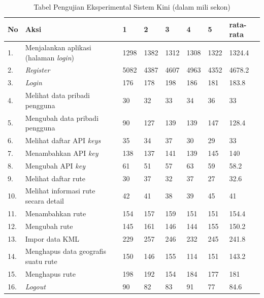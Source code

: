 \begin{table}[H]
	\centering
	\caption{Tabel Pengujian Eksperimental Sistem Kini (dalam mili sekon)}
		\begin{tabular}{|p{0.37cm}| p{7cm}| p{1cm}| p{1cm}| p{1cm}| p{1cm}| p{1cm}| p{1cm}|} \hline
		No & Aksi & 1 & 2 & 3 & 4 & 5 & rata-rata \\ \hline
		1. & Menjalankan aplikasi (halaman \textit{login}) & 1298	&	1382	&	1312	&	1308	&	1322	&	1324.4 \\ \hline
 		2. & \textit{Register} & 5082	&	4387	&	4607	&	4963	&	4352	&	4678.2 \\ \hline
		3. & \textit{Login} & 176	&	178	&	198	&	186	&	181	&	183.8 \\ \hline
		4. & Melihat data pribadi pengguna & 30	&	32	&	33	&	34	&	36	&	33 \\ \hline
		5. & Mengubah data pribadi pengguna & 90	&	127	&	139	&	139	&	147	&	128.4 \\ \hline
		6. & Melihat daftar API \textit{keys} & 35	&	34	&	37	&	30	&	29	&	33 \\ \hline
		7. & Menambahkan API \textit{key} & 138	&	137	&	141	&	139	&	145	&	140 \\ \hline
		8. & Mengubah API \textit{key} & 61	&	51	&	57	&	63	&	59	&	58.2 \\ \hline
		9. & Melihat daftar rute & 30	&	37	&	32	&	37	&	27	&	32.6 \\ \hline
		10. & Melihat informasi rute secara detail & 42	&	41	&	38	&	39	&	45	&	41 \\ \hline
		11. & Menambahkan rute & 154	&	157	&	159	&	151	&	151	&	154.4 \\ \hline
		12. & Mengubah rute & 145	&	161	&	146	&	144	&	155	&	150.2 \\ \hline
		13. & Impor data KML & 229	&	257	&	246	&	232	&	245	&	241.8 \\ \hline
		14. & Menghapus data geografis suatu rute & 150	&	146	&	155	&	114	&	151	&	143.2 \\ \hline
		15. & Menghapus rute & 198	&	192	&	154	&	184	&	177	&	181 \\ \hline
		16. & \textit{Logout} & 90	&	82	&	83	&	91	&	77	&	84.6 \\ \hline
		\end{tabular}
	\label{table:hasileksperimental1}
\end{table}

